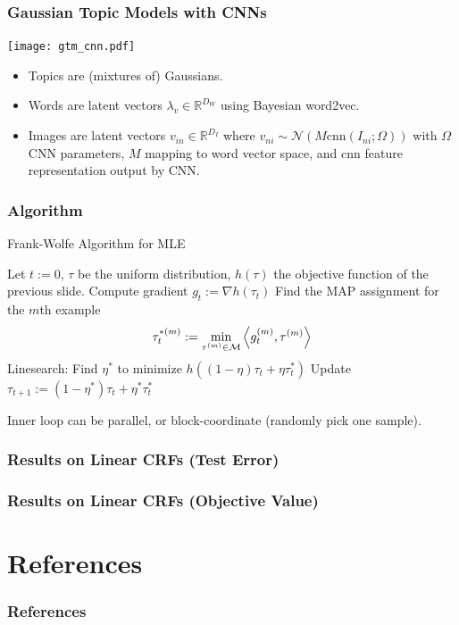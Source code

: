 \documentclass{beamer}
\begin{document}
\begin{frame}
  \frametitle{Gaussian Topic Models with CNNs}
  \begin{center}
    \texttt{[image: gtm\_cnn.pdf]}
    \begin{itemize}
    \item Topics are (mixtures of) Gaussians.
    \item Words are latent vectors $\lambda_v \in \mathbb{R}^{D_W}$ using Bayesian word2vec.
    \item Images are latent vectors $v_{in} \in \mathbb{R}^{D_I}$ where $v_{ni} \sim \mathcal{N}(M \text{cnn}(I_{ni} ; \Omega))$ with $\Omega$ CNN parameters, $M$ mapping to word vector space, and $\text{cnn}$ feature representation output by CNN.
    \end{itemize}
  \end{center}
\end{frame}

\begin{frame}
  \frametitle{Algorithm}
  \begin{algorithm}[H]
      \caption{Frank-Wolfe Algorithm for MLE}
    \begin{algorithmic}
      \State Let $t := 0$, $\tau$ be the uniform distribution, $h(\tau)$ the objective function of the previous slide.
      \Repeat
        \State Compute gradient $g_t := \nabla h(\tau_t)$
          \State Find the MAP assignment for the $m$th example $$\tau_{t}^{*(m)}:=\min_{\tau^{(m)}\in{\cal M}}\left\langle g^{(m)}_t,\tau^{(m)}\right\rangle$$
        \EndFor
        \State Linesearch: Find $\eta^{*}$ to minimize $h((1 - \eta)\tau_t + \eta\tau_{t}^{*})$
        \State Update $\tau_{t+1} := (1 - \eta^{*})\tau_t + \eta^{*}\tau_{t}^{*}$
       
    \end{algorithmic}
  \end{algorithm}
  Inner loop can be parallel, or block-coordinate (randomly pick one sample).
\end{frame}

\begin{frame}
  \frametitle{Results on Linear CRFs (Test Error)}
\end{frame}

\begin{frame}
  \frametitle{Results on Linear CRFs (Objective Value)}
\end{frame}

\section{References}
\begin{frame}[t,allowframebreaks]{}
\frametitle{References}
\printbibliography
\end{frame}
\end{document}
